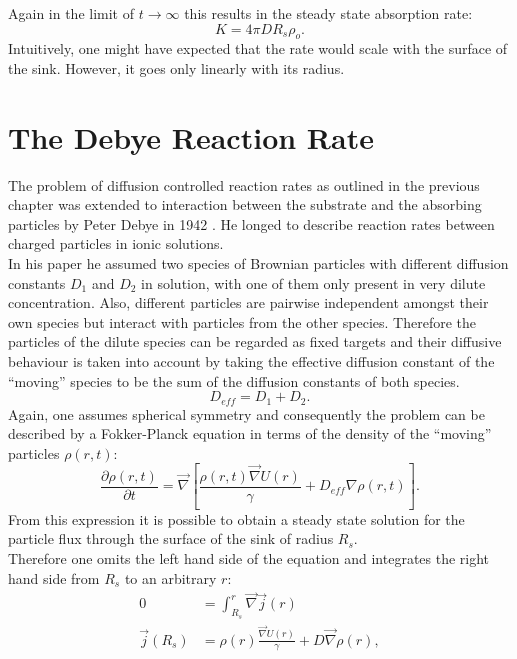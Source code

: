 Again in the limit of $t \rightarrow \infty$ this results in the steady state absorption rate:
\begin{equation}
    \boxed{K = 4 \pi D R_s \rho_o.}
    \label{steady state ideal rate}
\end{equation}
Intuitively, one might have expected that the rate would scale with the surface of the sink. However, it goes only linearly with its radius.
\section{The Debye Reaction Rate}
\label{The_Debye_Reaction_Rate}
The problem of diffusion controlled reaction rates as outlined in the previous chapter was extended to interaction between the substrate and the absorbing particles by Peter Debye in 1942 \cite{Debye1942}. He longed to describe reaction rates between charged particles in ionic solutions. \\
In his paper he assumed two species of Brownian particles with different diffusion constants $D_{1}$ and $D_{2}$ in solution, with one of them only present in very dilute concentration. Also, different particles are pairwise independent amongst their own species but interact with particles from the other species. Therefore the particles of the dilute species can be regarded as fixed targets and their diffusive behaviour is taken into account by taking the effective diffusion constant of the ``moving'' species to be the sum of the diffusion constants of both species. 
\begin{equation}
    D_{eff} = D_{1} + D_{2}.
\end{equation}
Again, one assumes spherical symmetry and consequently the problem can be described by a Fokker-Planck equation in terms of the density of the ``moving'' particles $\rho(r,t)$:
\begin{equation}
    \frac{\partial \rho(r,t)}{\partial t} = \vec \nabla \left[ \frac{\rho(r,t)\vec \nabla U(r)}{\gamma} + D_{eff} \nabla \rho(r,t) \right].
    \label{fpe_debye}
\end{equation}
From this expression it is possible to obtain a steady state solution for the particle flux through the surface of the sink of radius $R_s$. \\
Therefore one omits the left hand side of the equation and integrates the right hand side from $R_s$ to an arbitrary $r$:
\begin{align}
    0 &= \int_{R_s}^{r} \vec \nabla \vec j(r) \nonumber \\
    \vec j(R_s) &=  \rho(r)\frac{\vec \nabla U(r)}{\gamma} + D \vec \nabla \rho(r),
\end{align}
